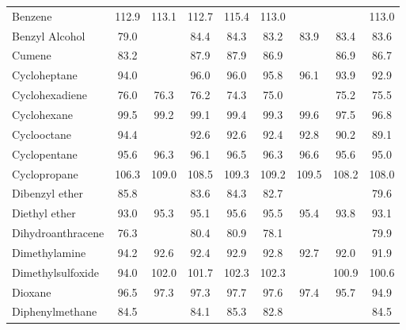 \begin{longtable}{m{3.1cm} | c c c c c c c c}
Benzene                          & 112.9     &  113.1   &  112.7   &   115.4     &   113.0    &          &         &   113.0   \\
Benzyl Alcohol                   &  79.0     &          &   84.4   &    84.3     &    83.2    &   83.9   &  83.4   &    83.6   \\
Cumene                           &  83.2     &          &   87.9   &    87.9     &    86.9    &          &  86.9   &    86.7   \\
Cycloheptane                     &  94.0     &          &   96.0   &    96.0     &    95.8    &   96.1   &  93.9   &    92.9   \\
Cyclohexadiene                   &  76.0     &   76.3   &   76.2   &    74.3     &    75.0    &          &  75.2   &    75.5   \\
Cyclohexane                      &  99.5     &   99.2   &   99.1   &    99.4     &    99.3    &   99.6   &  97.5   &    96.8   \\
Cyclooctane                      &  94.4     &          &   92.6   &    92.6     &    92.4    &   92.8   &  90.2   &    89.1   \\
Cyclopentane                     &  95.6     &   96.3   &   96.1   &    96.5     &    96.3    &   96.6   &  95.6   &    95.0   \\
Cyclopropane                     & 106.3     &  109.0   &  108.5   &   109.3     &   109.2    &  109.5   & 108.2   &   108.0   \\
Dibenzyl ether                   &  85.8     &          &   83.6   &    84.3     &    82.7    &          &         &    79.6   \\
Diethyl ether                    &  93.0     &   95.3   &   95.1   &    95.6     &    95.5    &   95.4   &  93.8   &    93.1   \\
Dihydroanthracene                &  76.3     &          &   80.4   &    80.9     &    78.1    &          &         &    79.9   \\
Dimethylamine                    &  94.2     &   92.6   &   92.4   &    92.9     &    92.8    &   92.7   &  92.0   &    91.9   \\
Dimethylsulfoxide                &  94.0     &  102.0   &  101.7   &   102.3     &   102.3    &          & 100.9   &   100.6   \\
Dioxane                          &  96.5     &   97.3   &   97.3   &    97.7     &    97.6    &   97.4   &  95.7   &    94.9   \\
Diphenylmethane                  &  84.5     &          &   84.1   &    85.3     &    82.8    &          &         &    84.5   \\

\end{longtable}
